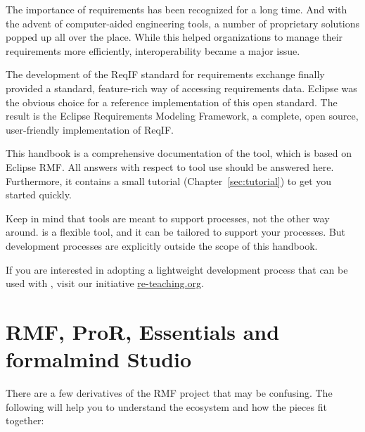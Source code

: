 % 

The importance of requirements has been recognized for a long time.  And with the advent of computer-aided engineering tools, a number of proprietary solutions popped up all over the place.  While this helped organizations to manage their requirements more efficiently, interoperability became a major issue.

The development of the ReqIF standard for requirements exchange finally provided a standard, feature-rich way of accessing requirements data.  Eclipse was the obvious choice for a reference implementation of this open standard.  The result is the Eclipse Requirements Modeling Framework, a complete, open source, user-friendly implementation of ReqIF.

This handbook is a comprehensive documentation of the \pror{} tool, which is based on Eclipse RMF.  All answers with respect to tool use should be answered here.  Furthermore, it contains a small tutorial (Chapter~\ref{sec:tutorial}) to get you started quickly.

Keep in mind that tools are meant to support processes, not the other way around.  \pror{} is a flexible tool, and it can be tailored to support your processes.  But development processes are explicitly outside the scope of this handbook.

\begin{info}
If you are interested in adopting a lightweight development process that can be used with \pror{}, visit our initiative \href{http://re-teaching.org}{re-teaching.org}.
\end{info}

\section{RMF, ProR, Essentials and formalmind Studio}

There are a few derivatives of the RMF project that may be confusing.  The following will
help you to understand the ecosystem and how the pieces fit together:

